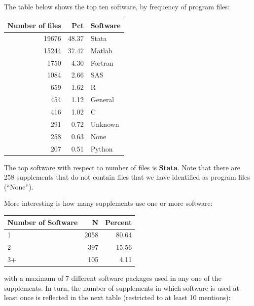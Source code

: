 \documentclass[]{article}
\begin{document}
The table below shows the top ten software, by frequency of program
files:

\begin{table}[H]
\centering
\begin{tabular}{r|r|l}
\hline
Number of files & Pct & Software\\
\hline
19676 & 48.37 & Stata\\
\hline
15244 & 37.47 & Matlab\\
\hline
1750 & 4.30 & Fortran\\
\hline
1084 & 2.66 & SAS\\
\hline
659 & 1.62 & R\\
\hline
454 & 1.12 & General\\
\hline
416 & 1.02 & C\\
\hline
291 & 0.72 & Unknown\\
\hline
258 & 0.63 & None\\
\hline
207 & 0.51 & Python\\
\hline
\end{tabular}
\end{table}

The top software with respect to number of files is \textbf{Stata}. Note
that there are 258 supplements that do not contain files that we have
identified as program files (``None'').

More interesting is how many supplements use one or more software:

\begin{table}[H]
\centering
\begin{tabular}{l|r|r}
\hline
Number of Software & N & Percent\\
\hline
1 & 2058 & 80.64\\
\hline
2 & 397 & 15.56\\
\hline
3+ & 105 & 4.11\\
\hline
\end{tabular}
\end{table}

with a maximum of 7 different software packages used in any one of the
supplements. In turn, the number of supplements in which software is
used at least once is reflected in the next table (restricted to at
least 10 mentions):
\end{document}
